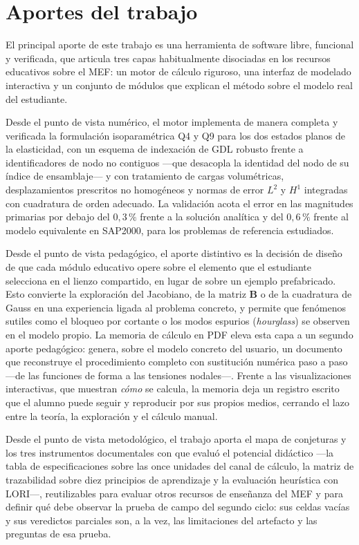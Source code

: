 \section*{Aportes del trabajo}

El principal aporte de este trabajo es una herramienta de software libre, funcional y verificada, que articula tres capas habitualmente disociadas en los recursos educativos sobre el MEF: un motor de cálculo riguroso, una interfaz de modelado interactiva y un conjunto de módulos que explican el método sobre el modelo real del estudiante.

Desde el punto de vista numérico, el motor implementa de manera completa y verificada la formulación isoparamétrica Q4 y Q9 para los dos estados planos de la elasticidad, con un esquema de indexación de GDL robusto frente a identificadores de nodo no contiguos —que desacopla la identidad del nodo de su índice de ensamblaje— y con tratamiento de cargas volumétricas, desplazamientos prescritos no homogéneos y normas de error $L^2$ y $H^1$ integradas con cuadratura de orden adecuado. La validación acota el error en las magnitudes primarias por debajo del $0{,}3\,\%$ frente a la solución analítica y del $0{,}6\,\%$ frente al modelo equivalente en SAP2000, para los problemas de referencia estudiados.

Desde el punto de vista pedagógico, el aporte distintivo es la decisión de diseño de que cada módulo educativo opere sobre el elemento que el estudiante selecciona en el lienzo compartido, en lugar de sobre un ejemplo prefabricado. Esto convierte la exploración del Jacobiano, de la matriz $\bm{B}$ o de la cuadratura de Gauss en una experiencia ligada al problema concreto, y permite que fenómenos sutiles como el bloqueo por cortante o los modos espurios (\emph{hourglass}) se observen en el modelo propio. La memoria de cálculo en PDF eleva esta capa a un segundo aporte pedagógico: genera, sobre el modelo concreto del usuario, un documento que reconstruye el procedimiento completo con sustitución numérica paso a paso —de las funciones de forma a las tensiones nodales—. Frente a las visualizaciones interactivas, que muestran \emph{cómo} se calcula, la memoria deja un registro escrito que el alumno puede seguir y reproducir por sus propios medios, cerrando el lazo entre la teoría, la exploración y el cálculo manual.

Desde el punto de vista metodológico, el trabajo aporta el mapa de conjeturas y los tres instrumentos documentales con que evaluó el potencial didáctico —la tabla de especificaciones sobre las once unidades del canal de cálculo, la matriz de trazabilidad sobre diez principios de aprendizaje y la evaluación heurística con LORI—, reutilizables para evaluar otros recursos de enseñanza del MEF y para definir qué debe observar la prueba de campo del segundo ciclo: sus celdas vacías y sus veredictos parciales son, a la vez, las limitaciones del artefacto y las preguntas de esa prueba.

